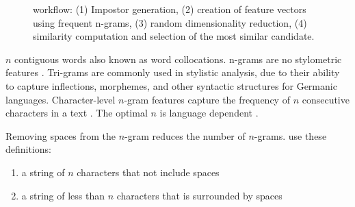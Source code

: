 \begin{figure}[htbp]
    \centering
    
    \caption{\impAppr{} workflow: (1) Impostor generation, (2) creation of feature vectors using frequent n-grams, (3) random dimensionality reduction, (4) similarity computation and selection of the most similar candidate.}
    \label{fig:impostor}
\end{figure}



  \begin{definition}
    [n-gram]
    $n$ contiguous words also known as word collocations. 
    n-grams are no stylometric features \citep{altakrori_topic_2021}.
    Tri-grams are commonly used in stylistic analysis, due to their ability to capture inflections, %
    morphemes, %
    and other syntactic structures for Germanic languages.
    Character-level $n$-gram features capture the frequency of $n$ consecutive characters in a text \citep{neal_surveying_2018}.
    The optimal $n$ is language dependent \citep{neal_surveying_2018}.
\end{definition}

\begin{definition}
    Removing spaces from the $n$-gram reduces the number of $n$-grams.
    \citet{koppel_authorship_2011} use these definitions:
    \begin{enumerate}
        \item a string of $n$ characters that not include spaces
        \item a string of less than $n$ characters that is surrounded by spaces
    \end{enumerate}
\end{definition}



